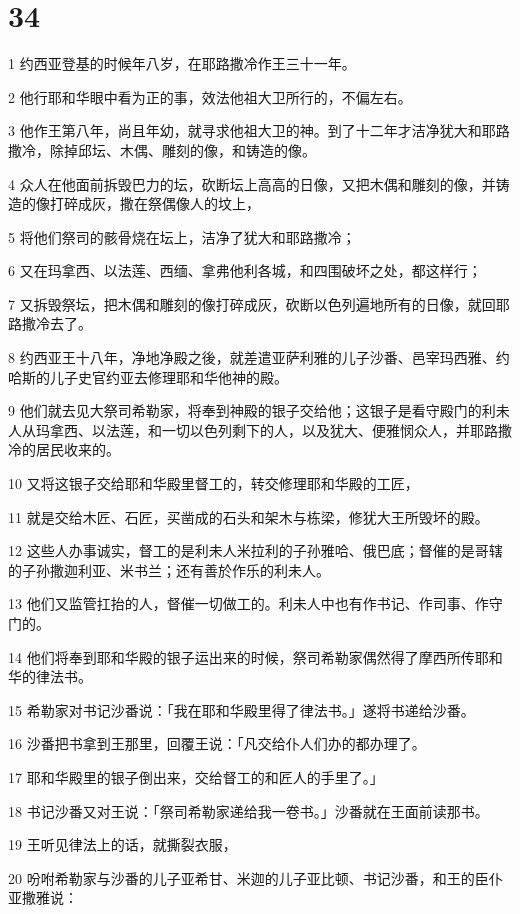 \chapter{34}

\par 1 约西亚登基的时候年八岁，在耶路撒冷作王三十一年。
\par 2 他行耶和华眼中看为正的事，效法他祖大卫所行的，不偏左右。
\par 3 他作王第八年，尚且年幼，就寻求他祖大卫的神。到了十二年才洁净犹大和耶路撒冷，除掉邱坛、木偶、雕刻的像，和铸造的像。
\par 4 众人在他面前拆毁巴力的坛，砍断坛上高高的日像，又把木偶和雕刻的像，并铸造的像打碎成灰，撒在祭偶像人的坟上，
\par 5 将他们祭司的骸骨烧在坛上，洁净了犹大和耶路撒冷；
\par 6 又在玛拿西、以法莲、西缅、拿弗他利各城，和四围破坏之处，都这样行；
\par 7 又拆毁祭坛，把木偶和雕刻的像打碎成灰，砍断以色列遍地所有的日像，就回耶路撒冷去了。
\par 8 约西亚王十八年，净地净殿之後，就差遣亚萨利雅的儿子沙番、邑宰玛西雅、约哈斯的儿子史官约亚去修理耶和华他神的殿。
\par 9 他们就去见大祭司希勒家，将奉到神殿的银子交给他；这银子是看守殿门的利未人从玛拿西、以法莲，和一切以色列剩下的人，以及犹大、便雅悯众人，并耶路撒冷的居民收来的。
\par 10 又将这银子交给耶和华殿里督工的，转交修理耶和华殿的工匠，
\par 11 就是交给木匠、石匠，买凿成的石头和架木与栋梁，修犹大王所毁坏的殿。
\par 12 这些人办事诚实，督工的是利未人米拉利的子孙雅哈、俄巴底；督催的是哥辖的子孙撒迦利亚、米书兰；还有善於作乐的利未人。
\par 13 他们又监管扛抬的人，督催一切做工的。利未人中也有作书记、作司事、作守门的。
\par 14 他们将奉到耶和华殿的银子运出来的时候，祭司希勒家偶然得了摩西所传耶和华的律法书。
\par 15 希勒家对书记沙番说：「我在耶和华殿里得了律法书。」遂将书递给沙番。
\par 16 沙番把书拿到王那里，回覆王说：「凡交给仆人们办的都办理了。
\par 17 耶和华殿里的银子倒出来，交给督工的和匠人的手里了。」
\par 18 书记沙番又对王说：「祭司希勒家递给我一卷书。」沙番就在王面前读那书。
\par 19 王听见律法上的话，就撕裂衣服，
\par 20 吩咐希勒家与沙番的儿子亚希甘、米迦的儿子亚比顿、书记沙番，和王的臣仆亚撒雅说：
